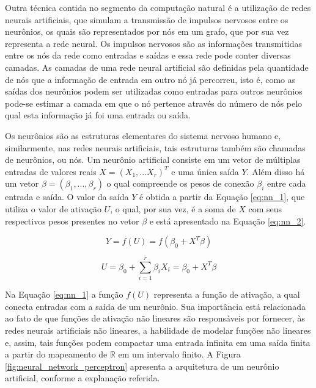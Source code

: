 \documentclass[11pt]{article}
\begin{document}
    Outra técnica contida no segmento da computação natural é a utilização de redes neurais artificiais, que simulam a transmissão de impulsos nervosos entre os neurônios, os quais são representados por nós em um grafo, que por sua vez representa a rede neural. \cite{rn_eng} Os impulsos nervosos são as informações transmitidas entre os nós da rede como entradas e saídas e essa rede pode conter diversas camadas. As camadas de uma rede neural artificial são definidas pela quantidade de nós que a informação de entrada em outro nó já percorreu, isto é, como as saídas dos neurônios podem ser utilizadas como entradas para outros neurônios pode-se estimar a camada em que o nó pertence através do número de nós pelo qual esta informação já foi uma entrada ou saída. \cite{katti} 
    
    
    Os neurônios são as estruturas elementares do sistema nervoso humano e, similarmente, nas redes neurais artificiais, tais estruturas também são chamadas de neurônios, ou nós. Um neurônio artificial consiste em um vetor de múltiplas entradas de valores reais $X = (X_1, ... X_r)^T$ e uma única saída $Y$. Além disso há um vetor $\beta = (\beta_1, ..., \beta_r)$ o qual compreende os pesos de conexão $\beta_i$ entre cada entrada e saída. O valor da saída $Y$ é obtida a partir da Equação \ref{eq:nn_1}, que utiliza o valor de ativação $U$, o qual, por sua vez, é a soma de $X$ com seus respectivos pesos presentes no vetor $\beta$ e está apresentado na Equação \ref{eq:nn_2}. \cite{djehiche}
    
    \begin{equation} \label{eq:nn_1}
        Y = f(U) = f(\beta_0 + X^T\beta)
    \end{equation}
    
    \begin{equation} \label{eq:nn_2}
        U = \beta_0 + \sum^r_{i=1} \beta_iX_i = \beta_0 + X^T \beta
    \end{equation}
    
    Na Equação \ref{eq:nn_1} a função $f(U)$ representa a função de ativação, a qual conecta entradas com a saída de um neurônio. Sua importância está relacionada ao fato de que funções de ativação não lineares são responsáveis por fornecer, às redes neurais artificiais não lineares, a habilidade de modelar funções não lineares e, assim, tais funções podem compactar uma entrada infinita em uma saída finita a partir do mapeamento de $\mathbb{R}$ em um intervalo finito.
    A Figura \ref{fig:neural_network_perceptron} apresenta a arquitetura de um neurônio artificial, conforme a explanação referida.
    
\end{document}
